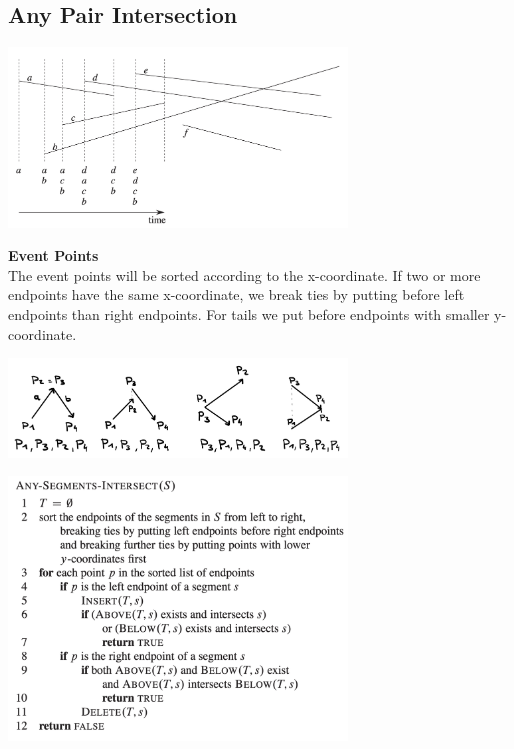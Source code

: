 \documentclass[10pt,a4paper,twocolumn]{article}
\begin{document}
\subsection{Any Pair Intersection}

\begin{center}
	\includegraphics[width=9cm]{images/any-intersection}
\end{center}

\textbf{Event Points}\\
The event points will be sorted according to the x-coordinate. If two or more endpoints have the same x-coordinate, we break ties by putting before left endpoints than right endpoints. For tails we put before endpoints with smaller y-coordinate.


\begin{center}
	\includegraphics[width=9cm]{images/endpoints-example}
\end{center}

\begin{center}
	\includegraphics[width=9cm]{images/pseudo-code-sweetlines}
\end{center}
\end{document}
